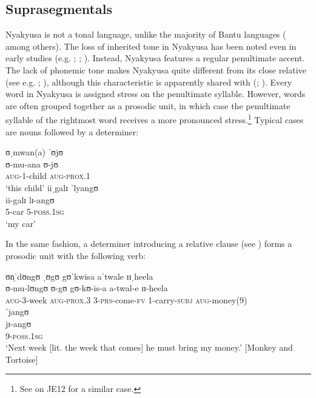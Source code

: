 \subsection{Suprasegmentals}\label{Stress} 
Nyakyusa is not a tonal language, unlike the majority of Bantu languages (\citealt{KisseberthCOddenD2003} among others). The loss of inherited tone in Nyakyusa has been noted even in early studies (e.g. \citealt{NurseD1979}; \citealt{GuthrieM1967}; \citealt{vanEssenOKaehler-MeyerE1969}). Instead, Nyakyusa features a regular penultimate accent. The lack of phonemic tone makes Nyakyusa quite different from its close relative  (see e.g. \citealt{NurseD1988}; \citealt{BotneR2008}), although this characteristic is apparently shared with  (\citealt{KishindoP1999}; \citealt{LabroussiC1999}). Every word in Nyakyusa is assigned stress on the penultimate syllable. However, words are often grouped together as a prosodic unit, in which case the penultimate syllable of the rightmost word receives a more pronounced stress.\footnote{See \citet{BickmoreLClemensL2016} on  JE12 for a similar case.} Typical cases are nouns followed by a determiner:
\begin{exe}
	\ex
	\glll ʊˌmwan(a) ˈʊjʊ\\
	ʊ-mu-ana ʊ-jʊ\\
	\textsc{aug}-1-child \textsc{aug}-\textsc{prox.1}\\
	\glt `this child'
	\ex
	\glll iiˌgalɪ ˈlyangʊ\\
	ii-galɪ lɪ-angʊ\\
	5-car 5-\textsc{poss.1sg}\\
	\glt \lq my car'
\end{exe}

In the same fashion, a determiner introducing a relative clause (see ) forms a prosodic unit with the following verb:
\begin{exe}
	\ex \glll ʊn̩ˈdʊngʊ ˌʊgʊ gʊˈkwisa aˈtwale ɪɪˌheela \\
	ʊ-mu-lʊngʊ ʊ-gʊ gʊ-kʊ-is-a a-twal-e ɪɪ-heela\\
	\textsc{aug}-3-week \textsc{aug}-\textsc{prox.3} 3-\textsc{prs}-come-\textsc{fv} 1-carry-\textsc{subj} \textsc{aug}-money(9)\\
	\sn \glll ˈjangʊ\\
	jɪ-angʊ\\
	9-\textsc{poss.1sg}\\
	\glt `Next week [lit. the week that comes] he must bring my money.' [Monkey and Tortoise]
\end{exe}
